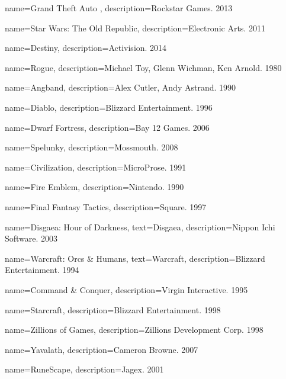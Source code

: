 \makeglossaries
\renewcommand*\glspostdescription{\dotfill}
\renewcommand{\glossarysection}[2][]{}
 
{
    name={Grand Theft Auto },
    description={Rockstar Games. 2013}
}

{
	name={Star Wars: The Old Republic},
	description={Electronic Arts. 2011}
}

{
	name={Destiny},
	description={Activision. 2014}
}

{
	name={Rogue},
	description={Michael Toy, Glenn Wichman, Ken Arnold. 1980}
}

{
	name={Angband},
	description={Alex Cutler, Andy Astrand. 1990}
}

{
	name={Diablo},
	description={Blizzard Entertainment. 1996}
}

{
	name={Dwarf Fortress},
	description={Bay 12 Games. 2006}
}

{
	name={Spelunky},
	description={Mossmouth. 2008}
}

{
	name={Civilization},
	description={MicroProse. 1991}
}

{
	name={Fire Emblem},
	description={Nintendo. 1990}
}

{
	name={Final Fantasy Tactics},
	description={Square. 1997}
}

{
	name={Disgaea: Hour of Darkness},
	text={Disgaea},
	description={Nippon Ichi Software. 2003}
}

{
	name={Warcraft: Orcs \& Humans},
	text={Warcraft},
	description={Blizzard Entertainment. 1994}
}

{
	name={Command \& Conquer},
	description={Virgin Interactive. 1995}
}

{
	name={Starcraft},
	description={Blizzard Entertainment. 1998}
}

{
	name={Zillions of Games},
	description={Zillions Development Corp. 1998}
}

{
	name={Yavalath},
	description={Cameron Browne. 2007}
}

{
	name={RuneScape},
	description={Jagex. 2001}
}